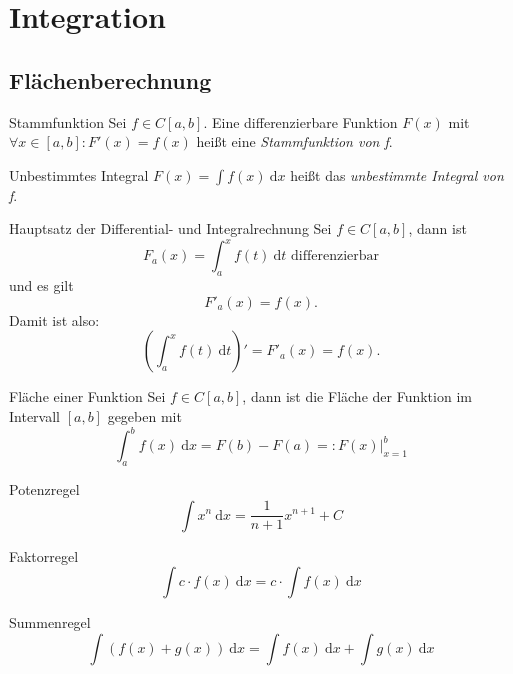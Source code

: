 \documentclass[german]{spicker}
\newcommand{\dx}{~\mathrm{d}x}
\newcommand{\dt}{~\mathrm{d}t}
\begin{document}
\newpage
\section{Integration}
\subsection{Flächenberechnung}

\begin{defi}{Stammfunktion}
    Sei $f\in C[a, b]$. Eine differenzierbare Funktion $F(x)$ mit $\forall x\in [a, b] : F'(x) = f(x)$ heißt eine \emph{Stammfunktion von f}.
\end{defi}

\begin{defi}{Unbestimmtes Integral}
    $F(x) = \int f(x) \dx$ heißt das \emph{unbestimmte Integral von f}.
\end{defi}

\begin{defi}{Hauptsatz der Differential- und Integralrechnung}
    Sei $f\in C[a, b]$, dann ist
    $$
        F_a(x) = \int^x_a f(t)\dt \text{ differenzierbar}
    $$
    und es gilt
    $$
        F'_a(x) = f(x).
    $$
    Damit ist also:
    $$
        \left(\int^x_a f(t)\dt\right)' = F'_a(x) = f(x).
    $$
\end{defi}

\begin{defi}{Fläche einer Funktion}
    Sei $f \in C[a, b]$, dann ist die Fläche der Funktion im Intervall $[a, b]$ gegeben mit
    $$
        \int_a^b f(x) \dx = F(b) - F(a) =: \left.F(x)\right|^b_{x=1}
    $$
\end{defi}

\begin{bonus}{Potenzregel}
    $$
        \int x^n \dx = \frac{1}{n+1}x^{n+1} + C
    $$
\end{bonus}

\begin{bonus}{Faktorregel}
    $$
        \int c\cdot f(x) \dx = c\cdot \int f(x) \dx
    $$
\end{bonus}

\begin{bonus}{Summenregel}
    $$
        \int (f(x) + g(x))\dx = \int f(x) \dx + \int g(x) \dx
    $$
\end{bonus}
\end{document}
